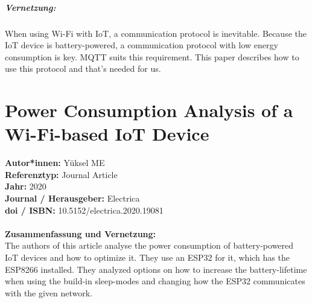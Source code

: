\documentclass{report}
\begin{document}
\paragraph{Vernetzung:}
When using Wi-Fi with IoT, a communication protocol is inevitable. Because the IoT device is battery-powered, a communication protocol with low energy consumption is key. MQTT suits this requirement. This paper describes how to use this protocol and that's needed for us.



{\let\clearpage\relax \chapter{Power Consumption Analysis of a Wi-Fi-based IoT Device}}
\noindent
\textbf{Autor*innen:} Yüksel ME\\
\textbf{Referenztyp:} Journal Article\\
\textbf{Jahr:} 2020\\
\textbf{Journal / Herausgeber:} Electrica\\
\textbf{doi / ISBN:} 10.5152/electrica.2020.19081\\\\
\textbf{Zusammenfassung und Vernetzung:}\\
The authors of this article analyse the power consumption of battery-powered IoT devices and how to optimize it. They use an ESP32 for it, which has the ESP8266 installed. They analyzed options on how to increase the battery-lifetime when using the build-in sleep-modes and changing how the ESP32 communicates with the given network.\\
\end{document}
